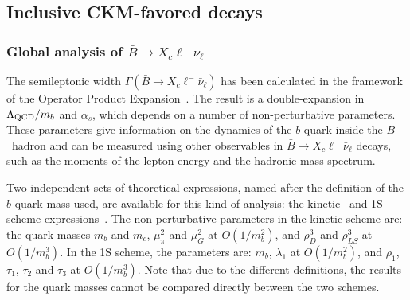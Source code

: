 \subsection{Inclusive CKM-favored decays}
\label{slbdecays_b2cincl}

\subsubsection{Global analysis of $\bar B\to X_c\ell^-\bar\nu_\ell$}

The semileptonic width $\Gamma(\bar B\to X_c\ell^-\bar\nu_\ell)$ has
been calculated in the framework of the Operator Product
Expansion~\cite{Shifman:1986mx,*Chay:1990da,*Bigi:1992su,*Bigi:1992su_erratum}.
The result is a double-expansion in $\Lambda_{\rm QCD}/m_b$ and
$\alpha_s$, which depends on a number of non-perturbative
parameters. These parameters give information on the dynamics of the
$b$-quark inside the $B$~hadron and can be measured using other
observables in $\bar B\to X_c\ell^-\bar\nu_\ell$ decays, such as the
moments of the lepton energy and the hadronic mass spectrum.

Two independent sets of theoretical expressions, named after the
definition of the $b$-quark mass used, are available for this kind of
analysis: the kinetic~\cite{Benson:2003kp,Gambino:2004qm,Gambino:2011cq} and 1S
scheme expressions~\cite{Bauer:2004ve}. The non-perturbative
parameters in the kinetic scheme
are: the quark masses $m_b$ and $m_c$, $\mu^2_\pi$ and
$\mu^2_G$ at $O(1/m^2_b)$, and $\rho^3_D$ and $\rho^3_{LS}$ at
$O(1/m^3_b)$. In the 1S scheme, the parameters are: $m_b$, $\lambda_1$
at $O(1/m^2_b)$, and $\rho_1$, $\tau_1$, $\tau_2$ and $\tau_3$ at
$O(1/m^3_b)$. Note that due to the different definitions, the results
for the quark masses cannot be compared directly between the two
schemes.

